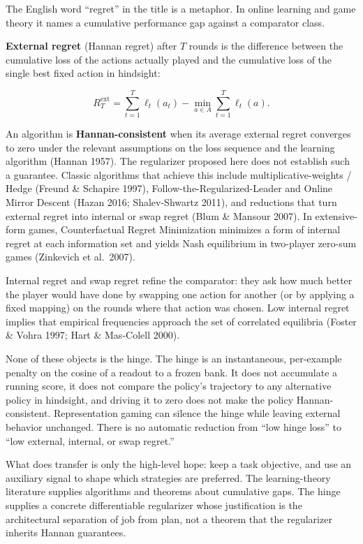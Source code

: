 \documentclass[11pt,a4paper]{article}
\begin{document}
The English word ``regret'' in the title is a metaphor. In online
learning and game theory it names a cumulative performance gap against a
comparator class.

\textbf{External regret} (Hannan regret) after \(T\) rounds is the
difference between the cumulative loss of the actions actually played
and the cumulative loss of the single best fixed action in hindsight:

\[
R_T^{\mathrm{ext}}
=
\sum_{t=1}^T \ell_t(a_t)
-
\min_{a\in A}\sum_{t=1}^T \ell_t(a).
\]

An algorithm is \textbf{Hannan-consistent} when its average external
regret converges to zero under the relevant assumptions on the loss
sequence and the learning algorithm (Hannan 1957). The regularizer
proposed here does not establish such a guarantee. Classic algorithms
that achieve this include multiplicative-weights / Hedge (Freund \&
Schapire 1997), Follow-the-Regularized-Leader and Online Mirror Descent
(Hazan 2016; Shalev-Shwartz 2011), and reductions that turn external
regret into internal or swap regret (Blum \& Mansour 2007). In
extensive-form games, Counterfactual Regret Minimization minimizes a
form of internal regret at each information set and yields Nash
equilibrium in two-player zero-sum games (Zinkevich et al.~2007).

Internal regret and swap regret refine the comparator: they ask how much
better the player would have done by swapping one action for another (or
by applying a fixed mapping) on the rounds where that action was chosen.
Low internal regret implies that empirical frequencies approach the set
of correlated equilibria (Foster \& Vohra 1997; Hart \& Mas-Colell
2000).

None of these objects is the hinge. The hinge is an instantaneous,
per-example penalty on the cosine of a readout to a frozen bank. It does
not accumulate a running score, it does not compare the policy's
trajectory to any alternative policy in hindsight, and driving it to
zero does not make the policy Hannan-consistent. Representation gaming
can silence the hinge while leaving external behavior unchanged. There
is no automatic reduction from ``low hinge loss'' to ``low external,
internal, or swap regret.''

What does transfer is only the high-level hope: keep a task objective,
and use an auxiliary signal to shape which strategies are preferred. The
learning-theory literature supplies algorithms and theorems about
cumulative gaps. The hinge supplies a concrete differentiable
regularizer whose justification is the architectural separation of job
from plan, not a theorem that the regularizer inherits Hannan
guarantees.
\end{document}

